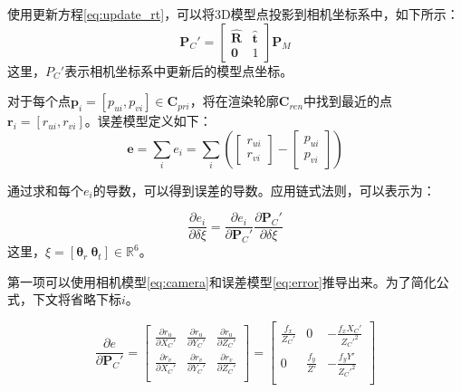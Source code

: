 使用更新方程\autoref{eq:update_rt}，可以将3D模型点投影到相机坐标系中，如下所示：
\begin{equation}
    \bm{P}_C' = 
\begin{bmatrix}
\bm{\hat{R}}&\bm{\hat{t}}\\
    \bm{0} & 1
\end{bmatrix}
\bm{P}_M
\label{eq:update_pc}
\end{equation}
这里，$P_C'$表示相机坐标系中更新后的模型点坐标。

对于每个点$\bm{p}_i=[p_{ui}, p_{vi}] \in \bm{C}_{pri}$，将在渲染轮廓$\bm{C}_{ren}$中找到最近的点$\bm{r}_i=[r_{ui}, r_{vi}]$。误差模型定义如下：
\begin{equation}
    \bm{e} = \sum_{i} e_i = \sum_{i} \left( \begin{bmatrix}r_{ui}\\r_{vi}\end{bmatrix}-\begin{bmatrix}p_{ui}\\p_{vi}\end{bmatrix} \right)
    \label{eq:error}
\end{equation}

通过求和每个$e_i$的导数，可以得到误差的导数。应用链式法则，可以表示为：

\begin{equation}
    \frac{\partial e_i}{\partial \delta \xi}=
\frac{\partial e_i}{\partial \bm{P}_C'} \frac{\partial \bm{P}_C'}{\partial \delta \xi}
\label{eq:dedxi}
\end{equation}
这里，$\xi=[\bm{\theta}_r \  \bm{\theta}_t] \in \mathbb{R}^6$。

第一项可以使用相机模型\autoref{eq:camera}和误差模型\autoref{eq:error}推导出来。为了简化公式，下文将省略下标$i$。

\begin{equation}
\frac{\partial e}{\partial \bm{P}_C'}=
\begin{bmatrix}
\frac{\partial r_{u}}{\partial X_C'}&\frac{\partial r_{u}}{\partial Y_C'}&\frac{\partial r_{u}}{\partial Z_C'}\\[5pt]\frac{\partial r_{v}}{\partial X_C'}&\frac{\partial r_{v}}{\partial Y_C'}&\frac{\partial r_{v}}{\partial Z_C'}\\ 
\end{bmatrix}
=
\begin{bmatrix}\frac{f_x}{Z_C'}&0&-\frac{f_x X_C'}{Z_C'^{2}}\\0&\frac{f_y}{Z'}&-\frac{f_y Y'}{Z_C'^{2}}\\ 
\end{bmatrix}
\label{eq:dedPC}
\end{equation}

